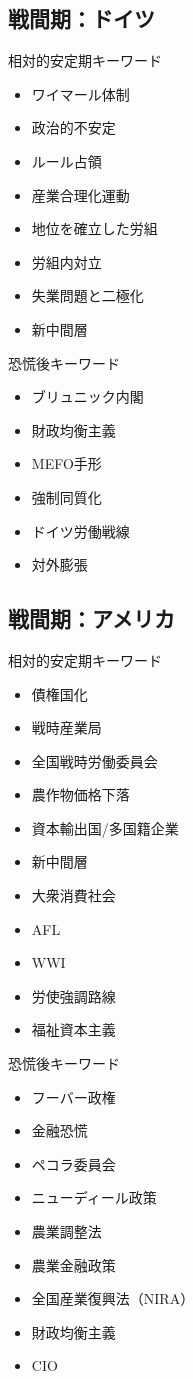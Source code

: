 \documentclass{jsarticle}
\begin{document}
\subsection{戦間期：ドイツ}
相対的安定期キーワード
\begin{itemize}
\item ワイマール体制
\item 政治的不安定
\item ルール占領
\item 産業合理化運動
\item 地位を確立した労組
\item 労組内対立
\item 失業問題と二極化
\item 新中間層
\end{itemize}
恐慌後キーワード
\begin{itemize}
\item ブリュニック内閣
\item 財政均衡主義
\item MEFO手形
\item 強制同質化
\item ドイツ労働戦線
\item 対外膨張
\end{itemize}

\subsection{戦間期：アメリカ}
相対的安定期キーワード
\begin{itemize}
\item 債権国化
\item 戦時産業局
\item 全国戦時労働委員会
\item 農作物価格下落
\item 資本輸出国/多国籍企業
\item 新中間層
\item 大衆消費社会
\item AFL
\item WWI
\item 労使強調路線
\item 福祉資本主義
\end{itemize}
恐慌後キーワード
\begin{itemize}
\item フーバー政権
\item 金融恐慌
\item ペコラ委員会
\item ニューディール政策
\item 農業調整法
\item 農業金融政策
\item 全国産業復興法（NIRA）
\item 財政均衡主義
\item CIO
\end{itemize}
\end{document}

